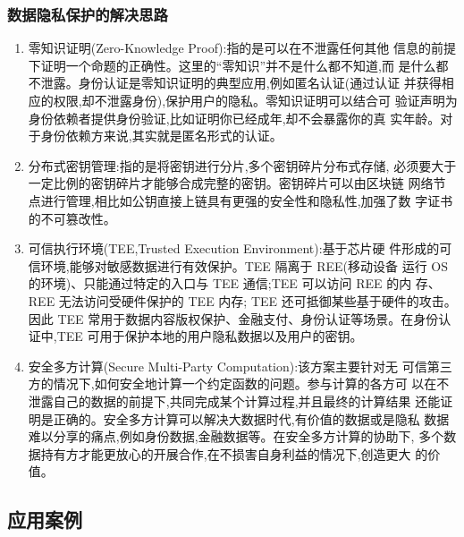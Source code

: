 \documentclass[11pt]{beamer}
\begin{document}
\begin{frame}[allowframebreaks]
	\frametitle{数据隐私保护的解决思路}
\begin{enumerate}
	\item 零知识证明(Zero-Knowledge Proof):{\tiny 指的是可以在不泄露任何其他
		信息的前提下证明一个命题的正确性。这里的“零知识”并不是什么都不知道,而
		是什么都不泄露。身份认证是零知识证明的典型应用,例如匿名认证(通过认证
		并获得相应的权限,却不泄露身份),保护用户的隐私。零知识证明可以结合可
		验证声明为身份依赖者提供身份验证,比如证明你已经成年,却不会暴露你的真
		实年龄。对于身份依赖方来说,其实就是匿名形式的认证。}
	\item 分布式密钥管理:{\tiny 指的是将密钥进行分片,多个密钥碎片分布式存储,
		必须要大于一定比例的密钥碎片才能够合成完整的密钥。密钥碎片可以由区块链
		网络节点进行管理,相比如公钥直接上链具有更强的安全性和隐私性,加强了数
		字证书的不可篡改性。}
	\item 可信执行环境(TEE,Trusted Execution Environment):{\tiny 基于芯片硬
		件形成的可信环境,能够对敏感数据进行有效保护。TEE 隔离于 REE(移动设备
		运行 OS 的环境)、只能通过特定的入口与 TEE 通信;TEE 可以访问 REE 的内
		存、 REE 无法访问受硬件保护的 TEE 内存; TEE 还可抵御某些基于硬件的攻击。
		因此 TEE 常用于数据内容版权保护、金融支付、身份认证等场景。在身份认证中,TEE 可用于保护本地的用户隐私数据以及用户的密钥。}
	\item 安全多方计算(Secure Multi-Party Computation):{\tiny 该方案主要针对无
	可信第三方的情况下,如何安全地计算一个约定函数的问题。参与计算的各方可
	以在不泄露自己的数据的前提下,共同完成某个计算过程,并且最终的计算结果
	还能证明是正确的。安全多方计算可以解决大数据时代,有价值的数据或是隐私
	数据难以分享的痛点,例如身份数据,金融数据等。在安全多方计算的协助下,
	多个数据持有方才能更放心的开展合作,在不损害自身利益的情况下,创造更大
	的价值。}
\end{enumerate}
\end{frame}

\subsection{应用案例}
\end{document}
